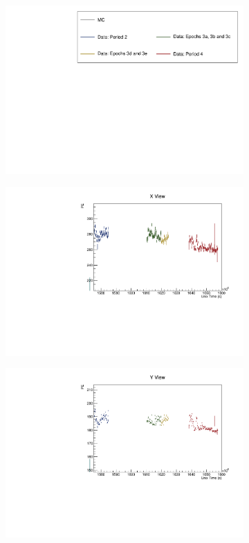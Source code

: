 \documentclass[12pt,a4paper]{article}
\begin{document}
\begin{figure}[!ht]
  \begin{subfigure}{\textwidth}
    \centering
    \includegraphics[height=0.2\linewidth]{essentialsec_tb/legend.pdf}
  \end{subfigure}
  \vspace*{2mm}
  
  \begin{subfigure}{0.5\textwidth}
    \includegraphics[width=\linewidth]{driftsec_tb/pe_time_x.pdf}
  \end{subfigure}
  \begin{subfigure}{0.5\textwidth}
    \includegraphics[width=\linewidth]{driftsec_tb/pe_time_y.pdf}

\end{subfigure}
\end{figure}
\end{document}
